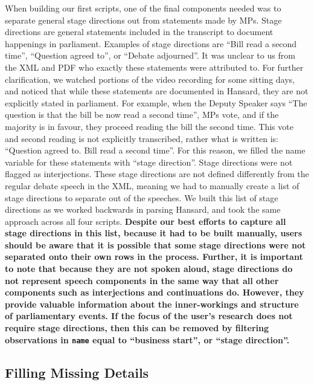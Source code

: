 \documentclass[
  letterpaper,
  DIV=11,
  numbers=noendperiod]{scrartcl}
\begin{document}
When building our first scripts, one of the final components needed was
to separate general stage directions out from statements made by MPs.
Stage directions are general statements included in the transcript to
document happenings in parliament. Examples of stage directions are
``Bill read a second time'', ``Question agreed to'', or ``Debate
adjourned''. It was unclear to us from the XML and PDF who exactly these
statements were attributed to. For further clarification, we watched
portions of the video recording for some sitting days, and noticed that
while these statements are documented in Hansard, they are not
explicitly stated in parliament. For example, when the Deputy Speaker
says ``The question is that the bill be now read a second time'', MPs
vote, and if the majority is in favour, they proceed reading the bill
the second time. This vote and second reading is not explicitly
transcribed, rather what is written is: ``Question agreed to. Bill read
a second time''. For this reason, we filled the name variable for these
statements with ``stage direction''. Stage directions were not flagged
as interjections. These stage directions are not defined differently
from the regular debate speech in the XML, meaning we had to manually
create a list of stage directions to separate out of the speeches. We
built this list of stage directions as we worked backwards in parsing
Hansard, and took the same approach across all four scripts.
\textbf{Despite our best efforts to capture all stage directions in this
list, because it had to be built manually, users should be aware that it
is possible that some stage directions were not separated onto their own
rows in the process. Further, it is important to note that because they
are not spoken aloud, stage directions do not represent speech
components in the same way that all other components such as
interjections and continuations do. However, they provide valuable
information about the inner-workings and structure of parliamentary
events. If the focus of the user's research does not require stage
directions, then this can be removed by filtering observations in
\texttt{name} equal to ``business start'', or ``stage direction''.}

\hypertarget{filling-missing-details}{%
\subsection{Filling Missing Details}\label{filling-missing-details}}
\end{document}
